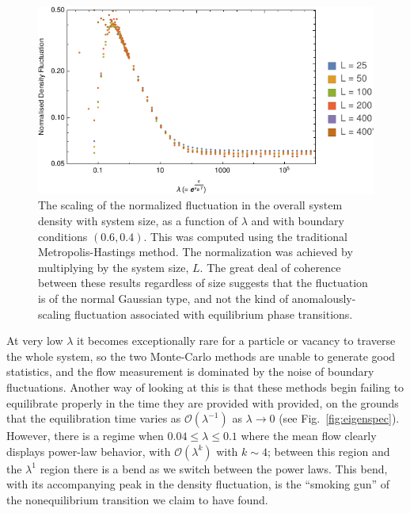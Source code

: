 \documentclass[
reprint, amsmath,amssymb,
]{revtex4-1}
\begin{document}
\begin{figure}[h!]
\vspace{0em}
\begin{center}
    \includegraphics[width=1\linewidth]{normDenFluc}
\end{center}
    \vspace{-0em}
\caption{\label{fig:DenFluc} The scaling of the normalized fluctuation in the overall system density with system size, as a function of $\lambda$ and with boundary conditions $(0.6, 0.4)$. 
This was computed using the traditional Metropolis-Hastings method. The normalization was achieved by multiplying by the system size, $L$. The great deal of coherence between these results regardless of size suggests
that the fluctuation is of the normal Gaussian type, and not the kind of anomalously-scaling fluctuation associated with equilibrium phase transitions.}
\end{figure}

At very low
$\lambda$ it becomes exceptionally rare for a particle or vacancy to
traverse the whole system, so the two Monte-Carlo methods are unable to generate good statistics, 
and the flow measurement is dominated by
the noise of boundary fluctuations. Another way of looking at this is that these methods begin failing
to equilibrate properly in the time they are provided with provided, on the grounds that the equilibration time varies as $\mathcal{O}(\lambda^{-1})$ as $\lambda \rightarrow 0$ (see Fig.~\ref{fig:eigenspec}).
However, there is a regime when $0.04 \le \lambda \le 0.1$
where the mean flow clearly displays power-law behavior,
with $\mathcal{O}(\lambda^{k})$ with $k \sim 4$; between this region and the
$\lambda^1$ region there is a bend as we switch between the power laws. This bend,
with its accompanying peak in the density fluctuation, is the ``smoking gun'' of the
nonequilibrium transition we claim to have found.
\end{document}
